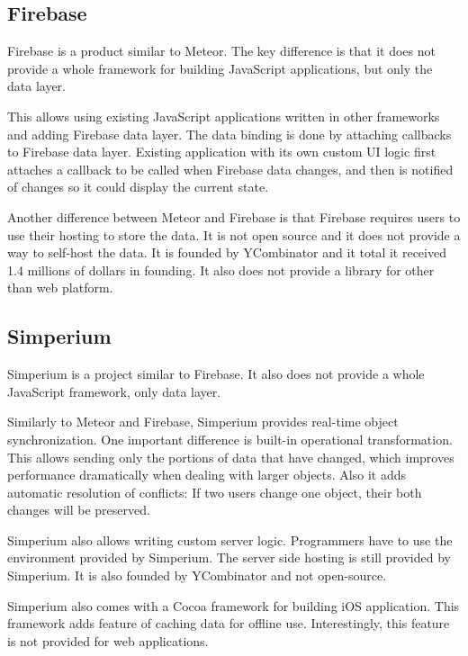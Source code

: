\subsection{Firebase}

Firebase \citep{firebase} is a product similar to Meteor. The key difference is that it does not provide a whole framework for building JavaScript applications, but only the data layer.

This allows using existing JavaScript applications written in other frameworks and adding Firebase data layer. The data binding is done by attaching callbacks to Firebase data layer. Existing application with its own custom UI logic first attaches a callback to be called when Firebase data changes, and then is notified of changes so it could display the current state.

Another difference between Meteor and Firebase is that Firebase requires users to use their hosting to store the data. It is not open source and it does not provide a way to self-host the data. It is founded by YCombinator \citep{ycombinator} and it total it received 1.4 millions of dollars in founding. \citep{firebase_funding} It also does not provide a library for other than web platform.

\subsection{Simperium}

Simperium is a project similar to Firebase. It also does not provide a whole JavaScript framework, only data layer.

Similarly to Meteor and Firebase, Simperium provides real-time object synchronization. One important difference is built-in operational transformation. \citep{ot} This allows sending only the portions of data that have changed, which improves performance dramatically when dealing with larger objects. Also it adds automatic resolution of conflicts: If two users change one object, their both changes will be preserved.

Simperium also allows writing custom server logic. Programmers have to use the environment provided by Simperium. The server side hosting is still provided by Simperium. It is also founded by YCombinator \citep{ycombinator} and not open-source. 

Simperium also comes with a Cocoa framework for building iOS application. This framework adds feature of caching data for offline use. Interestingly, this feature is not provided for web applications.

